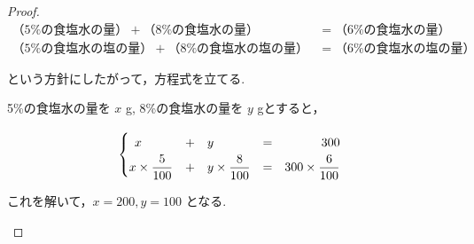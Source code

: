         \begin{proof}\mbox{}\\
            \begin{align*}
                （5\%の食塩水の量）+（8\%の食塩水の量） &=（6\%の食塩水の量） \\
                （5\%の食塩水の塩の量）+（8\%の食塩水の塩の量） &=（6\%の食塩水の塩の量）
            \end{align*}

            という方針にしたがって，方程式を立てる.

            \begin{hiddenanswer}
                5\%の食塩水の量を $x$ g, 8\%の食塩水の量を $y$ gとすると，

                \begin{align*}
                    \left\{
                    \begin{array}{@{} r @{\quad+\quad} l @{\quad=\quad} r @{}}
                        x\phantom{\times \dfrac{5}{100}} & y\phantom{\times \dfrac{8}{100}} & 300 \\
                        x \times \dfrac{5}{100} & y \times \dfrac{8}{100} & 300 \times \dfrac{6}{100}
                    \end{array}
                    \right.
                \end{align*}

                これを解いて，$x = 200, y = 100$ となる.

            \end{hiddenanswer}
        \end{proof}
\newpage
